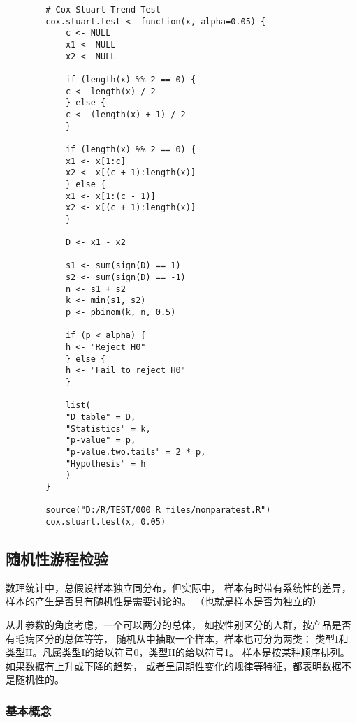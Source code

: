 \documentclass[UTF8]{ctexart}
\numberwithin{equation}{section}
\begin{document}
\begin{center}
    \begin{lstlisting}
        # Cox-Stuart Trend Test   
        cox.stuart.test <- function(x, alpha=0.05) {
            c <- NULL
            x1 <- NULL
            x2 <- NULL
        
            if (length(x) %% 2 == 0) {
            c <- length(x) / 2
            } else {
            c <- (length(x) + 1) / 2
            }
        
            if (length(x) %% 2 == 0) {
            x1 <- x[1:c]
            x2 <- x[(c + 1):length(x)]
            } else {
            x1 <- x[1:(c - 1)]
            x2 <- x[(c + 1):length(x)]
            }
        
            D <- x1 - x2
        
            s1 <- sum(sign(D) == 1)
            s2 <- sum(sign(D) == -1)
            n <- s1 + s2
            k <- min(s1, s2)
            p <- pbinom(k, n, 0.5)
        
            if (p < alpha) {
            h <- "Reject H0"
            } else {
            h <- "Fail to reject H0"
            }
        
            list(
            "D table" = D,
            "Statistics" = k,
            "p-value" = p,
            "p-value.two.tails" = 2 * p,
            "Hypothesis" = h
            )
        }

        source("D:/R/TEST/000 R files/nonparatest.R")
        cox.stuart.test(x, 0.05)
    \end{lstlisting}
\end{center}

\subsection{随机性游程检验}

数理统计中，总假设样本独立同分布，但实际中，
样本有时带有系统性的差异，样本的产生是否具有随机性是需要讨论的。
（也就是样本是否为独立的）

从非参数的角度考虑，一个可以两分的总体，
如按性别区分的人群，按产品是否有毛病区分的总体等等，
随机从中抽取一个样本，样本也可分为两类：
类型I和类型II。凡属类型I的给以符号0，类型II的给以符号1。
样本是按某种顺序排列。如果数据有上升或下降的趋势，
或者呈周期性变化的规律等特征，都表明数据不是随机性的。

\subsubsection{基本概念}
\end{document}

